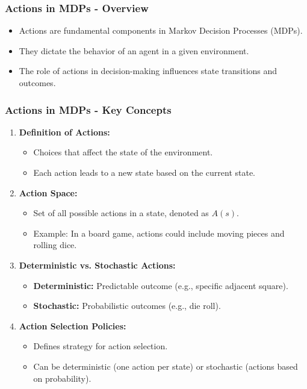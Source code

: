 \documentclass[aspectratio=169]{beamer}
\begin{document}
\begin{frame}[fragile]
    \frametitle{Actions in MDPs - Overview}
    \begin{itemize}
        \item Actions are fundamental components in Markov Decision Processes (MDPs).
        \item They dictate the behavior of an agent in a given environment.
        \item The role of actions in decision-making influences state transitions and outcomes.
    \end{itemize}
\end{frame}

\begin{frame}[fragile]
    \frametitle{Actions in MDPs - Key Concepts}
    \begin{enumerate}
        \item \textbf{Definition of Actions:}
        \begin{itemize}
            \item Choices that affect the state of the environment.
            \item Each action leads to a new state based on the current state.
        \end{itemize}
        
        \item \textbf{Action Space:}
        \begin{itemize}
            \item Set of all possible actions in a state, denoted as \( A(s) \).
            \item Example: In a board game, actions could include moving pieces and rolling dice.
        \end{itemize}
        
        \item \textbf{Deterministic vs. Stochastic Actions:}
        \begin{itemize}
            \item \textbf{Deterministic:} Predictable outcome (e.g., specific adjacent square).
            \item \textbf{Stochastic:} Probabilistic outcomes (e.g., die roll).
        \end{itemize}
        
        \item \textbf{Action Selection Policies:}
        \begin{itemize}
            \item Defines strategy for action selection.
            \item Can be deterministic (one action per state) or stochastic (actions based on probability).
        \end{itemize}
    \end{enumerate}
\end{frame}
\end{document}
